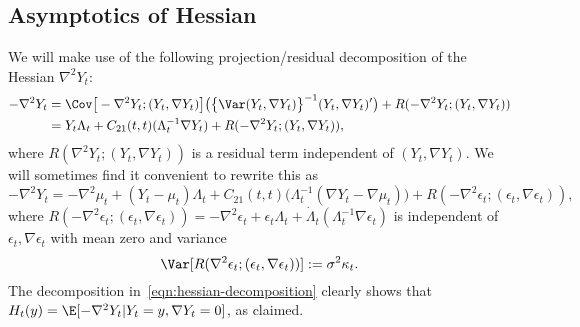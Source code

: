 \documentclass{article}
\begin{document}
	\subsection{Asymptotics of Hessian}
	\label{subsec:hessian-asymptotics}
	We will make use of the following projection/residual decomposition of the Hessian $\nabla^2 Y_t$:
	\begin{equation}
		\begin{aligned}
			-\nabla^2 Y_t 
			& = 
			\Cov\big[-\nabla^2 Y_t; (Y_t, \nabla Y_t)\big]\big(\big\{\Var(Y_t, \nabla Y_t)\big\}^{-1} (Y_t, \nabla Y_t)'\big) + R(-\nabla^2 Y_t; (Y_t, \nabla Y_t)) \\
			& = 
			Y_t \Lambda_t + C_{21}(t,t)(\Lambda_t^{-1} \nabla Y_t) + R(-\nabla^2 Y_t; (Y_t, \nabla Y_t)),
		\end{aligned}
	\end{equation}
	where $R(\nabla^2 Y_t; (Y_t, \nabla Y_t))$ is a residual term independent of $(Y_t, \nabla Y_t)$. We will sometimes find it convenient to rewrite this as
	\begin{equation}
		\label{eqn:hessian-decomposition}
		-\nabla^2 Y_t = -\nabla^2 \mu_t + (Y_t - \mu_t) \Lambda_t + C_{21}(t,t)\big(\Lambda_t^{-1} (\nabla Y_t - \nabla \mu_t)\big) + R(-\nabla^2 \epsilon_t; (\epsilon_t, \nabla \epsilon_t)),
	\end{equation}
	where $R(-\nabla^2 \epsilon_t; (\epsilon_t, \nabla \epsilon_t)) = -\nabla^2 \epsilon_t + \epsilon_t \Lambda_t + \dot{\Lambda}_t( \Lambda_t^{-1} \nabla \epsilon_t)$ is independent of $\epsilon_t,\nabla \epsilon_t$ with mean zero and variance
	\begin{equation}
		\label{eqn:hessian-decomposition-residual-variance}
		\Var[R(\nabla^2 \epsilon_t; (\epsilon_t, \nabla \epsilon_t))] := \sigma^2 \kappa_t.
	\end{equation} 
	The decomposition in~\eqref{eqn:hessian-decomposition} clearly shows that $H_t(y) = \E[-\nabla^2 Y_t|Y_t = y,\nabla Y_t = 0]$, as claimed.
	
\end{document}
